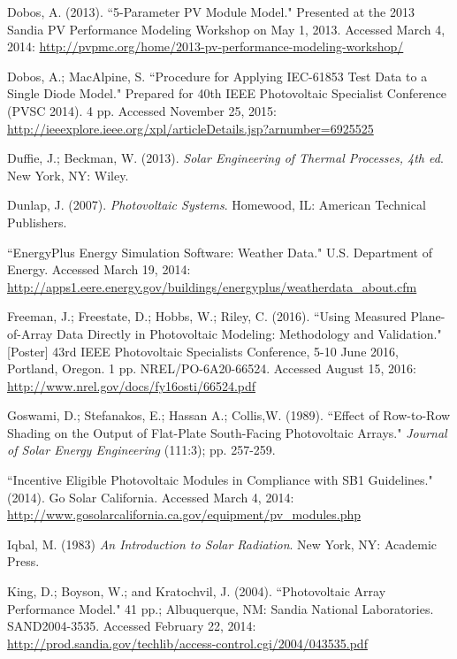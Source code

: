 \documentclass[12pt,letterpaper]{article}
\begin{document}
\begin{thebibliography}{99}
 Dobos, A. (2013). ``5-Parameter PV Module Model." Presented at the 2013 Sandia PV Performance Modeling Workshop on May 1, 2013. Accessed March 4, 2014: \url{http://pvpmc.org/home/2013-pv-performance-modeling-workshop/}

 Dobos, A.; MacAlpine, S. ``Procedure for Applying IEC-61853 Test Data to a Single Diode Model." Prepared for 40th IEEE Photovoltaic Specialist Conference (PVSC 2014). 4 pp. Accessed November 25, 2015: \url{http://ieeexplore.ieee.org/xpl/articleDetails.jsp?arnumber=6925525}

 Duffie, J.; Beckman, W. (2013). \textit{Solar Engineering of Thermal Processes, 4th ed}. New York, NY: Wiley.

 Dunlap, J. (2007). \textit{Photovoltaic Systems}. Homewood, IL: American Technical Publishers.

 ``EnergyPlus Energy Simulation Software: Weather Data." U.S. Department of Energy. Accessed March 19, 2014: \url{http://apps1.eere.energy.gov/buildings/energyplus/weatherdata_about.cfm}

 Freeman, J.; Freestate, D.; Hobbs, W.; Riley, C. (2016). ``Using Measured Plane-of-Array Data Directly in Photovoltaic Modeling: Methodology and Validation." [Poster] 43rd IEEE Photovoltaic Specialists Conference, 5-10 June 2016, Portland, Oregon. 1 pp. NREL/PO-6A20-66524. Accessed August 15, 2016: \url{http://www.nrel.gov/docs/fy16osti/66524.pdf}

 Goswami, D.; Stefanakos, E.; Hassan A.; Collis,W. (1989). ``Effect of Row-to-Row Shading on the Output of Flat-Plate South-Facing Photovoltaic Arrays." \textit{Journal of Solar Energy Engineering} (111:3); pp. 257-259.

 ``Incentive Eligible Photovoltaic Modules in Compliance with SB1 Guidelines." (2014). Go Solar California. Accessed March 4, 2014: \url{http://www.gosolarcalifornia.ca.gov/equipment/pv_modules.php}

 Iqbal, M. (1983) \textit{An Introduction to Solar 
Radiation}. New York, NY: Academic Press.

  King, D.; Boyson, W.; and Kratochvil, J. (2004). ``Photovoltaic Array Performance Model." 41 pp.; Albuquerque, NM: Sandia National Laboratories. SAND2004-3535. Accessed February 22, 2014: \url{http://prod.sandia.gov/techlib/access-control.cgi/2004/043535.pdf}


\end{thebibliography}
\end{document}
